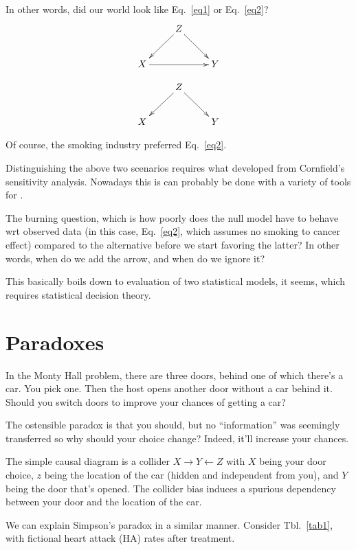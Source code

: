 \documentclass{article}
\begin{document}
In other words, did our world look like Eq.~\ref{eq1} or Eq.~\ref{eq2}?
\begin{align} \label{eq1}
  \xymatrix{
    &Z \ar[dl]\ar[dr]&\\
    X \ar[rr]& & Y
}
\end{align}

\begin{align} \label{eq2}
  \xymatrix{
    &Z \ar[dl]\ar[dr]&\\
    X & & Y
}
\end{align}

Of course, the smoking industry preferred Eq.~\ref{eq2}.

Distinguishing the above two scenarios requires what developed from Cornfield's sensitivity analysis. Nowadays this is can probably be done with a variety of tools for .

The burning question, which is how poorly does the null model have to behave wrt observed data (in this case, Eq.~\ref{eq2}, which assumes no smoking to cancer effect) compared to the alternative before we start favoring the latter? In other words, when do we add the arrow, and when do we ignore it?

This basically boils down to evaluation of two statistical models, it seems, which requires statistical decision theory.

\section{Paradoxes}

In the Monty Hall problem, there are three doors, behind one of which there's a car. You pick one. Then the host opens another door without a car behind it. Should you switch doors to improve your chances of getting a car?

The ostensible paradox is that you should, but no ``information'' was seemingly transferred so why should your choice change? Indeed, it'll increase your chances.

The simple causal diagram is a collider $X\rightarrow Y \leftarrow Z$ with $X$ being your door choice, $z$ being the location of the car (hidden and independent from you), and $Y$ being the door that's opened. The collider bias induces a spurious dependency between your door and the location of the car.

We can explain Simpson's paradox in a similar manner. Consider Tbl.~\ref{tab1}, with fictional heart attack (HA) rates after treatment.
\end{document}
